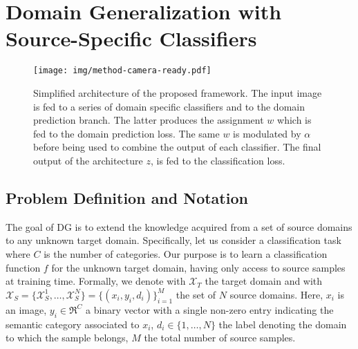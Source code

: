 \documentclass{article}
\begin{document}
\section{Domain Generalization with Source-Specific Classifiers}

\begin{figure}[t]
\centering
\texttt{[image: img/method-camera-ready.pdf]}
\vspace{-0.3cm}
    \caption{Simplified architecture of the proposed framework. The input image is fed to a series of domain specific classifiers and to the domain prediction branch. The latter produces the assignment $w$ which is fed to the domain prediction loss. The same $w$ is modulated by $\alpha$ before being used to combine the output of each classifier. The final output of the architecture $z$, is fed to the classification loss. \vspace{-0.4cm}    } 
   \label{fig:method}
\end{figure}
\vspace{-0.2cm}
\subsection{Problem Definition and Notation} \vspace{-0.3cm}
The goal of DG is to extend the knowledge acquired from a set of source domains to any unknown target domain. Specifically, let us consider a classification task where $C$ is the number of categories. Our purpose is to learn a classification function $f$ for the unknown target domain, having only access to source samples at training time. Formally, we denote with $\mathcal{X}_T$ the target domain and with $\mathcal{X}_S=\{\mathcal{X}^1_S,\dots,\mathcal{X}^N_S\}=\{(x_i, y_i, d_i)\}_{i=1}^M$  the set of $N$ source domains. Here, $x_i$ is an image, $y_i \in \Re^C$ a binary vector with a single non-zero entry indicating the semantic category associated to $x_i$, $d_i \in \{1,\dots, N\}$ the label denoting the domain to which the sample belongs, $M$ the total number of source samples. 



\vspace{-0.3cm}
\end{document}
